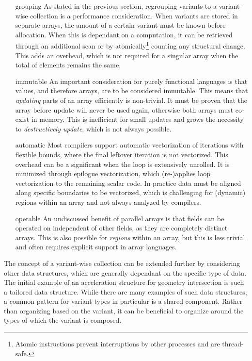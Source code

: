 \documentclass{article}
\begin{document}
\begin{itemize}
    \item [grouping]
    As stated in the previous section, regrouping variants to a variant-wise collection is a performance consideration.
    When variants are stored in separate arrays, the amount of a certain variant must be known before allocation.
    When this is dependant on a computation, it can be retrieved through an additional scan or by atomically\footnote{Atomic instructions prevent interruptions by other processes and are thread-safe.} counting any structural change.
    This adds an overhead, which is not required for a singular array when the total of elements remains the same.

    \item [immutable]
    An important consideration for purely functional languages is that values, and therefore arrays, are to be considered immutable.
    This means that {\it{updating}} parts of an array efficiently is non-trivial.
    It must be proven that the array before update will never be used again, otherwise both arrays must co-exist in memory.
    This is inefficient for small updates and grows the necessity to {\it destructively update}\cite{destructive-update-array}, which is not always possible.

    \item[automatic]
    Most compilers support automatic vectorization of iterations with flexible bounds, where the final leftover iteration is not vectorized.  
    This overhead can be a significant when the loop is extensively unrolled.
    It is minimized through epilogue vectorization, which (re-)applies loop vectorization to the remaining scalar code.
    In practice data must be aligned along specific boundaries to be vectorized, which is challenging for (dynamic) regions within an array and not always analyzed by compilers\cite{automatic-vectorization}.

    \item [operable]
    An undiscussed benefit of parallel arrays is that fields can be operated on independent of other fields, as they are completely distinct arrays.
    This is also possible for {\it regions} within an array, but this is less trivial and often requires explicit support in array languages\cite{accelerate-independent-regions}. 
\end{itemize}

The concept of a variant-wise collection can be extended further by considering other data structures, which are generally dependant on the specific type of data.
The initial example of an acceleration structure for geometry intersection is such a tailored data structure.
While there are many examples of such data structures, a common pattern for variant types in particular is a shared component.
Rather than organizing based on the variant, it can be beneficial to organize around the types of which the variant is composed.
\end{document}
